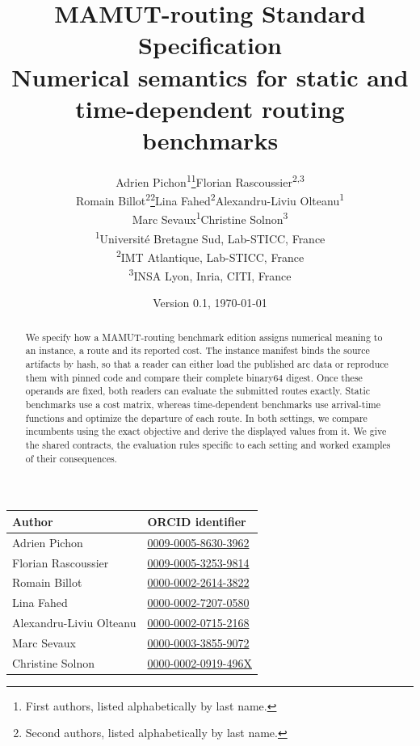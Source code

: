 \documentclass[12pt]{article}
\title{MAMUT-routing Standard Specification\\[0.7ex]\large Numerical semantics for static and time-dependent routing benchmarks}
\author{\normalsize Adrien Pichon\textsuperscript{1}\thanks{First authors, listed alphabetically by last name.}\quad Florian Rascoussier\textsuperscript{2,3}\footnotemark[1]\\
\normalsize Romain Billot\textsuperscript{2}\thanks{Second authors, listed alphabetically by last name.}\quad Lina Fahed\textsuperscript{2}\footnotemark[2]\quad Alexandru-Liviu Olteanu\textsuperscript{1}\footnotemark[2]\\
\normalsize Marc Sevaux\textsuperscript{1}\footnotemark[2]\quad Christine Solnon\textsuperscript{3}\footnotemark[2]\\[0.7ex]
\small \textsuperscript{1}Université Bretagne Sud, Lab-STICC, France\\
\small \textsuperscript{2}IMT Atlantique, Lab-STICC, France\\
\small \textsuperscript{3}INSA Lyon, Inria, CITI, France}
\date{Version 0.1, \today}
\begin{document}
\begin{singlespace}
\maketitle
\begin{abstract}
We specify how a MAMUT-routing benchmark edition assigns numerical meaning to an instance, a route and its reported cost. The instance manifest binds the source artifacts by hash, so that a reader can either load the published arc data or reproduce them with pinned code and compare their complete binary64 digest. Once these operands are fixed, both readers can evaluate the submitted routes exactly. Static benchmarks use a cost matrix, whereas time-dependent benchmarks use arrival-time functions and optimize the departure of each route. In both settings, we compare incumbents using the exact objective and derive the displayed values from it. We give the shared contracts, the evaluation rules specific to each setting and worked examples of their consequences.
\end{abstract}

\begin{center}
\small
\begin{tabular}{ll}
\toprule
Author & ORCID identifier\\
\midrule
Adrien Pichon & \href{https://orcid.org/0009-0005-8630-3962}{0009-0005-8630-3962}\\
Florian Rascoussier & \href{https://orcid.org/0009-0005-3253-9814}{0009-0005-3253-9814}\\
Romain Billot & \href{https://orcid.org/0000-0002-2614-3822}{0000-0002-2614-3822}\\
Lina Fahed & \href{https://orcid.org/0000-0002-7207-0580}{0000-0002-7207-0580}\\
Alexandru-Liviu Olteanu & \href{https://orcid.org/0000-0002-0715-2168}{0000-0002-0715-2168}\\
Marc Sevaux & \href{https://orcid.org/0000-0003-3855-9072}{0000-0003-3855-9072}\\
Christine Solnon & \href{https://orcid.org/0000-0002-0919-496X}{0000-0002-0919-496X}\\
\bottomrule
\end{tabular}
\end{center}
\end{singlespace}

\clearpage
\tableofcontents
\clearpage





\printbibliography[heading=bibintoc]
\clearpage
\appendix

\clearpage

\clearpage

\clearpage

\clearpage

\clearpage

\clearpage

\clearpage

\clearpage
{}
\end{document}
